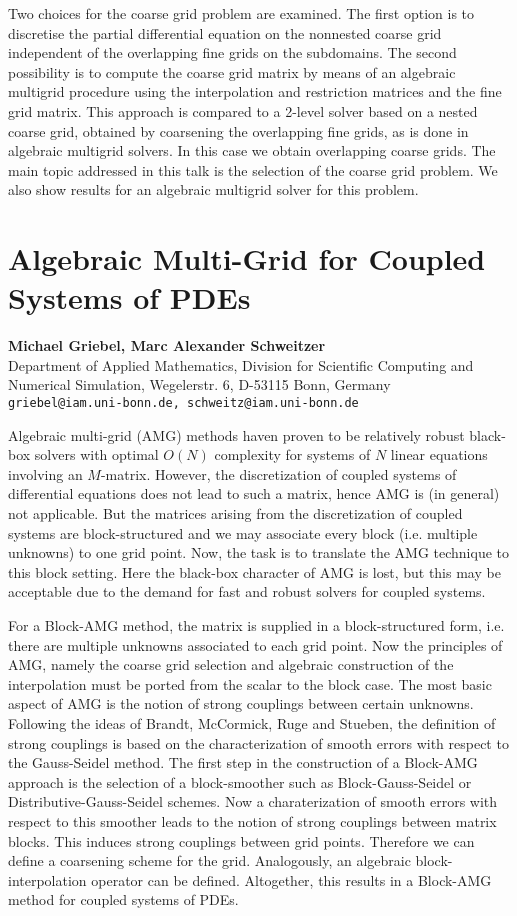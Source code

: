 \documentclass[11pt]{article}
\newcommand{\nextab}[4]{
	\section{#2}
	{\bf #1} \\ \nopagebreak
	{#3} \\ \nopagebreak
	{\tt #4} \nopagebreak
	}
\begin{document}
Two choices for the coarse grid problem are examined.  The first option is
to discretise the partial differential equation on the nonnested coarse
grid independent of the overlapping fine grids on the subdomains.  The
second possibility is to compute the coarse grid matrix by means of an
algebraic multigrid procedure using the interpolation and restriction
matrices and the fine grid matrix.  This approach is compared to a 2-level
solver based on a nested coarse grid, obtained by coarsening the
overlapping fine grids, as is done in algebraic multigrid solvers.  In this
case we obtain overlapping coarse grids.  The main topic addressed in this
talk is the selection of the coarse grid problem.  We also show results for
an algebraic multigrid solver for this problem.


\nextab{Michael Griebel, Marc Alexander Schweitzer}
	{Algebraic Multi-Grid for Coupled Systems of PDEs}
	{Department of Applied Mathematics,
	Division for Scientific Computing and Numerical Simulation,
	Wegelerstr. 6, D-53115 Bonn, Germany}
	{griebel@iam.uni-bonn.de, schweitz@iam.uni-bonn.de}

Algebraic multi-grid (AMG) methods haven proven to be relatively robust black-box solvers with optimal
$O(N)$ complexity for systems of $N$ linear equations involving an
$M$-matrix.
However, the discretization of coupled systems of differential
equations does not lead to such a matrix,
hence AMG is (in general) not applicable.
But the matrices arising from the discretization of coupled systems
are block-structured and we may associate every block
(i.e. multiple unknowns) to one grid point.
Now, the task is to translate the AMG technique to this block setting.
Here the black-box character of AMG is lost, but this may be acceptable
due to the demand for fast and robust solvers for coupled systems.

For a Block-AMG method, the matrix is supplied in a block-structured form, i.e.
there are multiple unknowns associated to each grid point.
Now the principles of AMG, namely the coarse grid selection and algebraic construction of the interpolation
must be ported from the scalar to the block case.
The most basic aspect of AMG is the notion of strong couplings between certain unknowns.
Following the ideas of Brandt, McCormick, Ruge and Stueben,
the definition of strong couplings is based on the characterization of smooth errors
with respect to the Gauss-Seidel method. The first step in the construction of a
Block-AMG approach is the selection of a block-smoother such as Block-Gauss-Seidel or Distributive-Gauss-Seidel
schemes. Now a charaterization of smooth errors with respect to this smoother leads to
the notion of strong couplings between matrix blocks. This induces strong couplings between grid points.
Therefore we can define a coarsening scheme for the grid. Analogously, an algebraic block-interpolation
operator can be defined. Altogether, this results in a Block-AMG method for coupled systems of PDEs.
\end{document}
